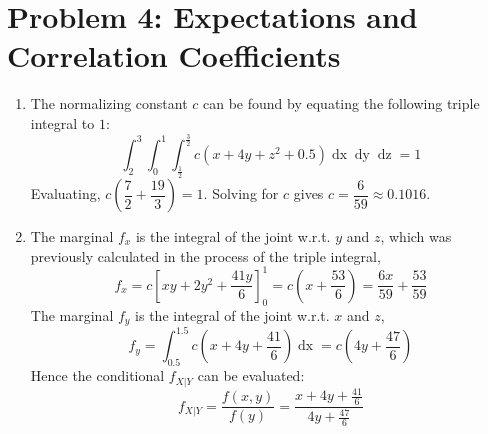 \documentclass[a4paper]{article}
\begin{document}
\section{Problem 4: Expectations and Correlation Coefficients}
\begin{enumerate}
\item The normalizing constant $c$ can be found by equating the following triple integral to $1$:
\begin{equation}
\int_2^3\int_0^1\int_{\frac{1}{2}}^{\frac{3}{2}} c(x+4y+z^2+0.5) \mathop{dx} \mathop{dy} \mathop{dz} = 1
\end{equation}
Evaluating, $c\left(\dfrac{7}{2}+\dfrac{19}{3} \right)=1$. Solving for $c$ gives $c=\dfrac{6}{59} \approx 0.1016$.

\item The marginal $f_x$ is the integral of the joint w.r.t. $y$ and $z$, which was previously calculated in the process of the triple integral,
\begin{equation}
f_x = c\left[xy+2y^2+\frac{41y}{6}\right]_0^1 = c\left(x+\frac{53}{6}\right)
= \frac{6x}{59}+\frac{53}{59}
\end{equation}
The marginal $f_y$ is the integral of the joint w.r.t. $x$ and $z$,
\begin{equation}
f_y = \int_{0.5}^{1.5} c \left(x+4y+\frac{41}{6}\right) \mathop{dx} = c \left(4y+\frac{47}{6}\right)
\end{equation}
Hence the conditional $f_{X|Y}$ can be evaluated:
\begin{equation}
f_{X|Y} = \frac{f(x,y)}{f(y)} = \frac{x+4y+\frac{41}{6}}{4y+\frac{47}{6}}
\end{equation}


\end{enumerate}
\end{document}

